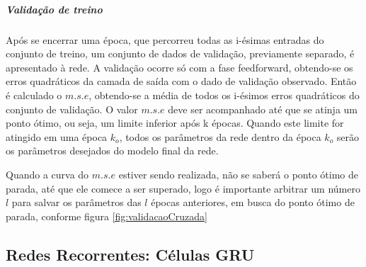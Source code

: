     \begin{figure}[H]
    \label{fig:otimizadores}
    \end{figure}
    
    \subparagraph{Validação de treino}
        Após se encerrar uma época, que percorreu todas as i-ésimas entradas do conjunto de treino, um conjunto de dados de validação, previamente separado, é apresentado à rede.
        A validação ocorre só com a fase feedforward, obtendo-se os erros quadráticos da camada de saída com o dado de validação observado.
        Então é calculado o $m.s.e$, obtendo-se a média de todos os i-ésimos erros quadráticos do conjunto de validação.
        O valor $m.s.e$ deve ser acompanhado até que se atinja um ponto ótimo, ou seja, um limite inferior após k épocas.
        Quando este limite for atingido em uma época $k_o$, todos os parâmetros da rede dentro da época $k_o$ serão os parâmetros desejados do modelo final da rede.
        
        Quando a curva do $m.s.e$ estiver sendo realizada, não se saberá o ponto ótimo de parada, até que ele comece a ser superado, logo é importante arbitrar um número $l$ para salvar os parâmetros das $l$ épocas anteriores, em busca do ponto ótimo de parada, conforme figura \ref{fig:validacaoCruzada}
        
    \subsection{Redes Recorrentes: Células GRU}

